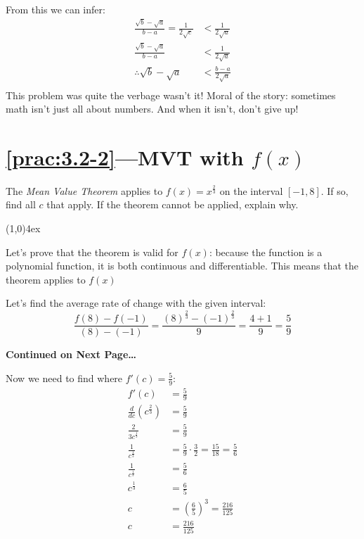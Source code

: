 \documentclass{MathNotes}
\newcommand{\continued}{
	\mbox{}
	\vfill
	\textbf{Continued on Next Page\ldots}\newpage
}
\newcommand{\br}{
	\begin{center}
		\line(1,0){4ex}
	\end{center}}
\begin{document}
From this we can infer:
\begin{align*}
	\frac{\sqrt{b}-\sqrt{a}}{b-a}=\frac{1}{2\sqrt{c}} & <\frac{1}{2\sqrt{a}}   \\
	\frac{\sqrt{b}-\sqrt{a}}{b-a}                     & <\frac{1}{2\sqrt{a}}   \\
	\therefore\sqrt{b}-\sqrt{a}                       & <\frac{b-a}{2\sqrt{a}} \\
\end{align*}
This problem was quite the verbage wasn't it! Moral of the story: sometimes
math isn't just all about numbers. And when it isn't, don't give up!

\section*{\ref{prac:3.2-2}---MVT with $f(x)$}\label{ans:3.2-2}
The \textit{Mean Value Theorem} applies to $f(x)=x^{\frac{2}{3}}$ on the
interval $[-1, 8]$. If so, find all $c$ that apply. If the theorem cannot
be applied, explain why.
\br
{}
Let's prove that the theorem is valid for $f(x)$: because the function is
a polynomial function, it is both continuous and differentiable. This means
that the theorem applies to $f(x)$

Let's find the average rate of change with the given interval:
\begin{displaymath}
	\frac{f(8)-f(-1)}{(8)-(-1)}=\frac{(8)^{\frac{2}{3}}-(-1)^{\frac{2}{3}}}{9}
	=\frac{4+1}{9}=\frac{5}{9}
\end{displaymath}
\continued
Now we need to find where $f'(c)=\frac{5}{9}$:
\begin{align*}
	f'(c)                       & =\frac{5}{9}                                           \\
	\frac{d}{dc}(c^\frac{2}{3}) & =\frac{5}{9}                                           \\
	\frac{2}{3c^{\frac{1}{3}}}  & =\frac{5}{9}                                           \\
	\frac{1}{c^{\frac{1}{3}}}   & =\frac{5}{9}\cdot\frac{3}{2}=\frac{15}{18}=\frac{5}{6} \\
	\frac{1}{c^{\frac{1}{3}}}   & =\frac{5}{6}                                           \\
	c^{\frac{1}{3}}             & =\frac{6}{5}                                           \\
	c                           & =(\frac{6}{5})^3=\frac{216}{125}                       \\
	c                           & =\frac{216}{125}                                       \\
\end{align*}
\end{document}
